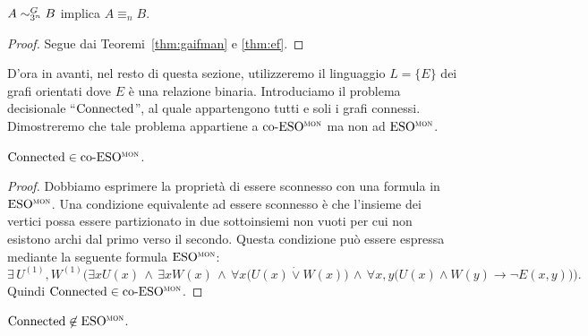 \begin{corollario}
  $A \sim^{G}_{3^n} B$ implica $A \equiv_n B$.
  \label{cor:gaifman-formule}
\end{corollario}

\begin{proof}
  Segue dai Teoremi~\ref{thm:gaifman} e \ref{thm:ef}.
\end{proof}



D'ora in avanti, nel resto di questa sezione, utilizzeremo il linguaggio $L=\{E\}$ dei grafi orientati dove $E$ è una relazione binaria.
Introduciamo il problema decisionale ``$\operatorname{Connected}$'', al quale appartengono tutti e soli i grafi connessi.
Dimostreremo che tale problema appartiene a $\operatorname{co-ESO^{\normalfont\textsc{mon}}}$ ma non ad $\operatorname{ESO^{\normalfont\textsc{mon}}}$.

\begin{lemma}
  $\operatorname{Connected} \in \operatorname{co-ESO^{\normalfont\textsc{mon}}}$.
  \label{lemma:connected-coESOmon}
\end{lemma}

\begin{proof}
  Dobbiamo esprimere la proprietà di essere sconnesso con una formula in $\operatorname{ESO^{\normalfont\textsc{mon}}}$.
  Una condizione equivalente ad essere sconnesso è che l'insieme dei vertici possa essere partizionato in due sottoinsiemi non vuoti per cui non esistono archi dal primo verso il secondo. Questa condizione può essere espressa mediante la seguente formula $\operatorname{ESO^{\normalfont\textsc{mon}}}$:
  \[ \exists \, U^{(1)}, W^{(1)} \Big( \exists x U(x) \,\wedge\, \exists x W(x) \,\wedge\, \forall x \big( U(x) \dot\lor W(x) \big) \,\wedge\, \forall x,y \big( U(x)\wedge W(y) \rightarrow \lnot E(x,y)\big) \Big). \]
  Quindi $\operatorname{Connected} \in \operatorname{co-ESO^{\normalfont\textsc{mon}}}$.
\end{proof}


\begin{lemma}
  $\operatorname{Connected} \not\in \operatorname{ESO^{\normalfont\textsc{mon}}}$.
  \label{lemma:connected-not-ESOmon}
\end{lemma}

